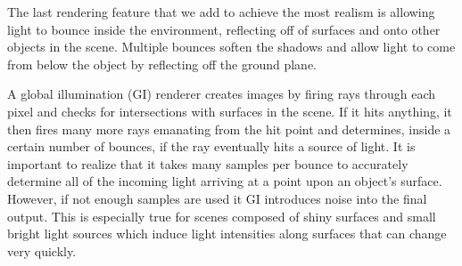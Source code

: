 \documentclass[10pt,twocolumn,letterpaper]{article}
\begin{document}

The last rendering feature that we add to achieve the most realism is allowing light to bounce inside the environment, reflecting off of surfaces and onto other objects in the scene.  Multiple bounces soften the shadows and allow light to come from below the object by reflecting off the ground plane.


A global illumination (GI) renderer creates images by firing rays through each pixel and checks for intersections with surfaces in the scene.  If it hits anything, it then fires many more rays emanating from the hit point and determines, inside a certain number of bounces, if the ray eventually hits a source of light.  It is important to realize that it takes many samples per bounce to accurately determine all of the incoming light arriving at a point upon an object's surface.
However, if not enough samples are used it GI introduces noise into the final output. This is especially true for scenes composed of shiny surfaces and small bright light sources which induce light intensities along surfaces that can change very quickly.
\end{document}

